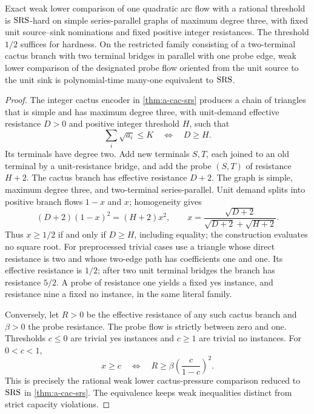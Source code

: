 \begin{theorem}
\label{thm:a-bound-arc-srs}
Exact weak lower comparison of one quadratic arc flow with a rational
threshold is $\mathrm{SRS}$-hard on simple series-parallel graphs of maximum
degree three, with fixed unit source--sink nominations and fixed positive
integer resistances. The threshold $1/2$ suffices for hardness.
On the restricted family consisting of a two-terminal cactus branch
with two terminal bridges in parallel with one probe edge, weak lower
comparison of the designated probe flow oriented from the unit source
to the unit sink is polynomial-time many-one equivalent to $\mathrm{SRS}$.
\end{theorem}
\begin{proof}
The integer cactus encoder in \cref{thm:a-cac-srs} produces a chain of triangles that is simple and has maximum degree
three, with unit-demand effective
resistance $D>0$ and positive integer threshold $H$, such that
\[
 \sum_i\sqrt{a_i}\le K\quad\Longleftrightarrow\quad D\ge H.
\]
Its terminals have degree two. Add new terminals $S,T$, each joined to
an old terminal by a unit-resistance bridge, and add the probe $(S,T)$
of resistance $H+2$. The cactus branch has effective resistance $D+2$.
The graph is simple, maximum degree three, and two-terminal
series-parallel. Unit demand splits into positive branch flows $1-x$
and $x$; homogeneity gives
\[
 (D+2)(1-x)^2=(H+2)x^2,
 \qquad x=\frac{\sqrt{D+2}}{\sqrt{D+2}+\sqrt{H+2}}.
\]
Thus $x\ge1/2$ if and only if $D\ge H$, including equality; the
construction evaluates no square root. For
preprocessed trivial cases use a triangle whose direct resistance is
two and whose two-edge path has coefficients one and one. Its effective
resistance is $1/2$; after two unit terminal bridges the branch has
resistance $5/2$. A probe of resistance one yields a fixed yes instance,
and resistance nine a fixed no instance, in the same literal family.

Conversely, let $R>0$ be the effective resistance of any such cactus
branch and $\beta>0$ the probe resistance. The probe flow is strictly
between zero and one. Thresholds $c\le0$ are trivial yes instances and
$c\ge1$ are trivial no instances. For $0<c<1$,
\[
 x\ge c\quad\Longleftrightarrow\quad
 R\ge\beta\left(\frac c{1-c}\right)^2.
\]
This is precisely the rational weak lower cactus-pressure comparison
reduced to $\mathrm{SRS}$ in \cref{thm:a-cac-srs}. The equivalence keeps weak
inequalities distinct from strict capacity violations.
\end{proof}

